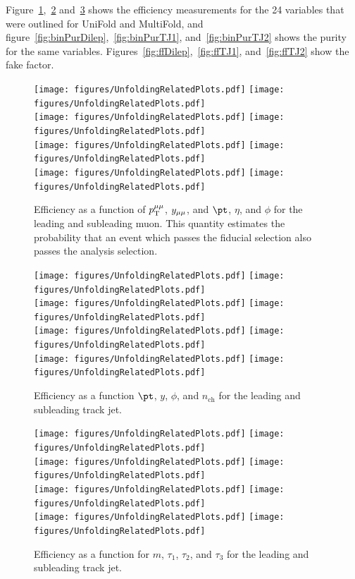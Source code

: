 Figure~\ref{fig:EffDilep},~\ref{fig:EffTJ1} and~\ref{fig:EffTJ2} shows the efficiency measurements for the 24 variables that were outlined for UniFold and MultiFold, and figure~\ref{fig:binPurDilep},~\ref{fig:binPurTJ1}, and~\ref{fig:binPurTJ2} shows the purity for the same variables. Figures~\ref{fig:ffDilep},~\ref{fig:ffTJ1}, and~\ref{fig:ffTJ2} show the fake factor.

\begin{figure}[h!]
  \centering
  \texttt{[image: figures/UnfoldingRelatedPlots.pdf]}
  \texttt{[image: figures/UnfoldingRelatedPlots.pdf]} \\
  \texttt{[image: figures/UnfoldingRelatedPlots.pdf]}
  \texttt{[image: figures/UnfoldingRelatedPlots.pdf]} \\
  \texttt{[image: figures/UnfoldingRelatedPlots.pdf]}
  \texttt{[image: figures/UnfoldingRelatedPlots.pdf]} \\
  \texttt{[image: figures/UnfoldingRelatedPlots.pdf]}
  \texttt{[image: figures/UnfoldingRelatedPlots.pdf]} \\
  \caption{Efficiency as a function of $p_\mathrm{T}^{\mu\mu}$, $y_{\mu\mu}$, and $\pt$, $\eta$, and $\phi$ for the leading and subleading muon. This quantity estimates the probability that an event which passes the fiducial selection also passes the analysis selection.}
  \label{fig:EffDilep}
\end{figure}

\begin{figure}[h!]
  \centering
  \texttt{[image: figures/UnfoldingRelatedPlots.pdf]}
  \texttt{[image: figures/UnfoldingRelatedPlots.pdf]} \\
  \texttt{[image: figures/UnfoldingRelatedPlots.pdf]}
  \texttt{[image: figures/UnfoldingRelatedPlots.pdf]} \\
  \texttt{[image: figures/UnfoldingRelatedPlots.pdf]}
  \texttt{[image: figures/UnfoldingRelatedPlots.pdf]} \\
  \texttt{[image: figures/UnfoldingRelatedPlots.pdf]}
  \texttt{[image: figures/UnfoldingRelatedPlots.pdf]}
  \caption{Efficiency as a function $\pt$, $y$, $\phi$, and $n_{\text{ch}}$ for the leading and subleading track jet.}
  \label{fig:EffTJ1}
\end{figure}

\begin{figure}[h!]
  \centering
  \texttt{[image: figures/UnfoldingRelatedPlots.pdf]}
  \texttt{[image: figures/UnfoldingRelatedPlots.pdf]} \\
  \texttt{[image: figures/UnfoldingRelatedPlots.pdf]}
  \texttt{[image: figures/UnfoldingRelatedPlots.pdf]} \\
  \texttt{[image: figures/UnfoldingRelatedPlots.pdf]}
  \texttt{[image: figures/UnfoldingRelatedPlots.pdf]} \\
  \texttt{[image: figures/UnfoldingRelatedPlots.pdf]}
  \texttt{[image: figures/UnfoldingRelatedPlots.pdf]}
  \caption{Efficiency as a function for $m$, $\tau_1$, $\tau_2$, and $\tau_3$ for the leading and subleading track jet.}
  \label{fig:EffTJ2}
\end{figure}

